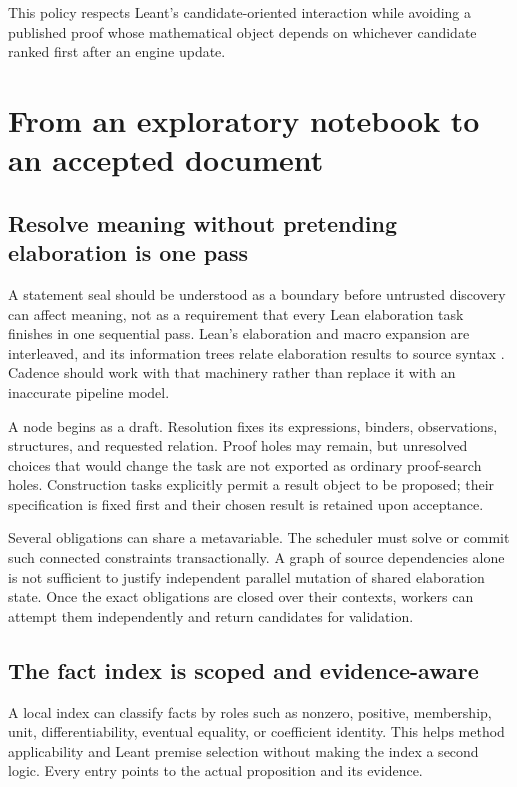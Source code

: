 \documentclass[11pt,letterpaper]{article}
\theoremstyle{definition}
\begin{document}
This policy respects Leant's candidate-oriented interaction while avoiding a
published proof whose mathematical object depends on whichever candidate ranked
first after an engine update.

\section{From an exploratory notebook to an accepted document}\label{sec:lifecycle}
\subsection{Resolve meaning without pretending elaboration is one pass}
A statement seal should be understood as a boundary before untrusted discovery
can affect meaning, not as a requirement that every Lean elaboration task finishes
in one sequential pass. Lean's elaboration and macro expansion are interleaved,
and its information trees relate elaboration results to source syntax
\cite{leanelab}. Cadence should work with that machinery rather than replace it with
an inaccurate pipeline model.

A node begins as a draft. Resolution fixes its expressions, binders, observations,
structures, and requested relation. Proof holes may remain, but unresolved choices
that would change the task are not exported as ordinary proof-search holes.
Construction tasks explicitly permit a result object to be proposed; their
specification is fixed first and their chosen result is retained upon acceptance.

Several obligations can share a metavariable. The scheduler must solve or commit
such connected constraints transactionally. A graph of source dependencies alone
is not sufficient to justify independent parallel mutation of shared elaboration
state. Once the exact obligations are closed over their contexts, workers can
attempt them independently and return candidates for validation.

\subsection{The fact index is scoped and evidence-aware}
A local index can classify facts by roles such as nonzero, positive, membership,
unit, differentiability, eventual equality, or coefficient identity. This helps
method applicability and Leant premise selection without making the index a
second logic. Every entry points to the actual proposition and its evidence.
\end{document}
